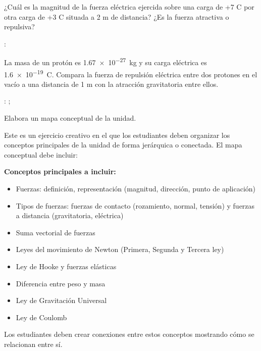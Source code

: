 \begin{exercise}
    ¿Cuál es la magnitud de la fuerza eléctrica ejercida sobre una carga de +7 C por otra carga de +3 C situada a 2 m de distancia?
    ¿Es la fuerza atractiva o repulsiva?

    \datos{}: \ctecoulomb

\end{exercise}

\begin{exercise}
    La masa de un protón es \qty{1.67e-27}{\kilo\g} y su carga eléctrica es \qty{1.6e-19}{\coulomb}.
    Compara la fuerza de repulsión eléctrica entre dos protones en el vacío a una distancia de 1 m con la atracción gravitatoria entre ellos.

    \datos{}: \ctecoulomb; \Ggravitacion

\end{exercise}


\begin{exercise}
    Elabora un mapa conceptual de la unidad.
    \begin{solu}
        Este es un ejercicio creativo en el que los estudiantes deben organizar los conceptos principales de la unidad de forma jerárquica o conectada. El mapa conceptual debe incluir:

        \textbf{Conceptos principales a incluir:}
        \begin{itemize}
            \item Fuerzas: definición, representación (magnitud, dirección, punto de aplicación)
            \item Tipos de fuerzas: fuerzas de contacto (rozamiento, normal, tensión) y fuerzas a distancia (gravitatoria, eléctrica)
            \item Suma vectorial de fuerzas
            \item Leyes del movimiento de Newton (Primera, Segunda y Tercera ley)
            \item Ley de Hooke y fuerzas elásticas
            \item Diferencia entre peso y masa
            \item Ley de Gravitación Universal
            \item Ley de Coulomb
        \end{itemize}
        Los estudiantes deben crear conexiones entre estos conceptos mostrando cómo se relacionan entre sí.
    \end{solu}
\end{exercise}



